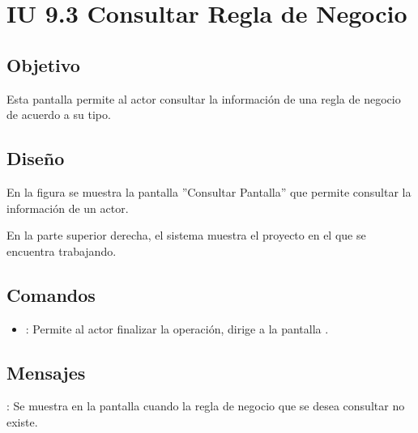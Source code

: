 \section{IU 9.3 Consultar Regla de Negocio}

\subsection{Objetivo}
	Esta pantalla permite al actor consultar la información de una regla de negocio de acuerdo a su tipo.
\subsection{Diseño}
	En la figura  se muestra la pantalla ''Consultar Pantalla'' que permite consultar la información de un actor.
	
	En la parte superior derecha, el sistema muestra el proyecto en el que se encuentra trabajando.

\subsection{Comandos}
\begin{itemize}
	\item {}: Permite al actor finalizar la operación, dirige a la pantalla .
\end{itemize}

\subsection{Mensajes}

\begin{Citemize}
	\item {}: Se muestra en la pantalla  cuando la regla de negocio que se desea consultar no existe.
\end{Citemize}
